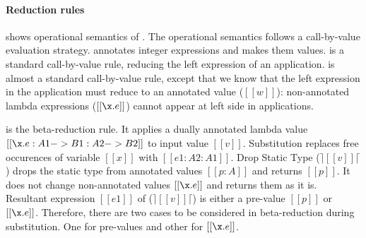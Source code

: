 \paragraph{Reduction rules}
 shows operational semantics of \cal.
The operational semantics follows a call-by-value evaluation strategy.
 annotates integer expressions and makes them
values.  is a standard call-by-value rule, reducing
the left expression of an application.
 is almost a standard call-by-value rule, except
that we know that the left expression in the application must reduce
to an annotated value ($[[w]]$): non-annotated lambda expressions
($[[\x.e]]$) cannot appear at left side in applications.

 is the beta-reduction rule. It applies a dually
annotated lambda value $[[\x.e : A1 -> B1 : A2 -> B2]]$ to input
value $[[v]]$. Substitution replaces free occurences of variable
$[[x]]$ with $[[e1:A2:A1]]$.
Drop Static Type ($\rceil[[v]]\lceil$) drops the static type
from annotated values $[[p:A]]$ and returns $[[p]]$.
It does not change non-annotated values $[[\x.e]]$ and returns 
them as it is. Resultant expression $[[e1]]$ of ($\rceil[[v]]\lceil$)
is either a pre-value $[[p]]$ or $[[\x.e]]$.
Therefore, there are two cases to be considered in beta-reduction
during substitution. One for pre-values and other for $[[\x.e]]$.

